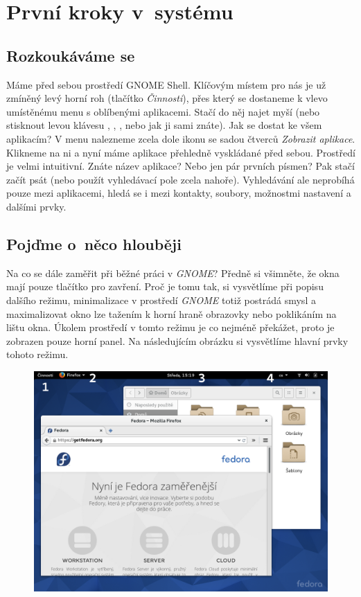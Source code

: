 \chapter*{První kroky v~systému}

\section*{Rozkoukáváme se}
Máme před sebou prostředí GNOME Shell. Klíčovým místem pro nás je už zmíněný levý horní roh (tlačítko \emph{Činnosti}), přes který se dostaneme k vlevo umístěnému menu s oblíbenými aplikacemi. Stačí do něj najet myší (nebo stisknout levou klávesu , , , nebo jak ji sami znáte). Jak se dostat ke všem aplikacím? V menu nalezneme zcela dole ikonu se sadou čtverců \emph{Zobrazit aplikace}. Klikneme na ni a nyní máme aplikace přehledně vyskládané před sebou. Prostředí je velmi intuitivní. Znáte název aplikace? Nebo jen pár prvních písmen? Pak stačí začít psát (nebo použít vyhledávací pole zcela nahoře). Vyhledávání ale neprobíhá pouze mezi aplikacemi, hledá se i mezi kontakty, soubory, možnostmi nastavení a dalšími prvky.

\section*{Pojďme o~něco hlouběji}
Na co se dále zaměřit při běžné práci v \emph{GNOME}? Předně si všimněte, že okna mají pouze tlačítko pro zavření. Proč je tomu tak, si vysvětlíme při popisu dalšího režimu, minimalizace v prostředí \emph{GNOME} totiž postrádá smysl a maximalizovat okno lze tažením k horní hraně obrazovky nebo poklikáním na lištu okna. Úkolem prostředí v tomto režimu je co nejméně překážet, proto je zobrazen pouze horní panel. Na následujícím obrázku si vysvětlíme hlavní prvky tohoto režimu.

\begin{figure}[t]
\begin{center}
\includegraphics[width=\textwidth]{img/shell-a}
 \label{fig:shell-a}
\end{center}
\end{figure}

